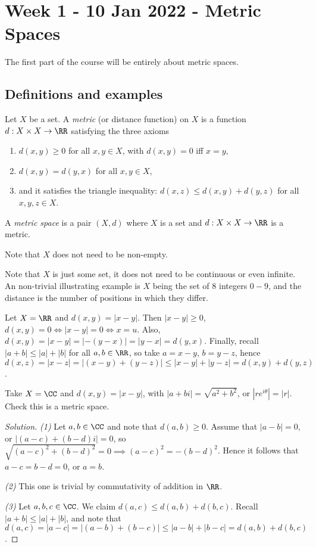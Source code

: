 \section{Week 1 - 10 Jan 2022 - Metric Spaces}
The first part of the course will be entirely about metric spaces.
\subsection{Definitions and examples}
\begin{definition}
  Let $X$ be a set. A \emph{metric} (or distance function) on $X$ is a function
  $d:X\times X \to \RR$ satisfying the three axioms
  \begin{enumerate}
    \item $d(x,y)\geq 0$ for all $x,y\in X$, with $d(x,y)=0$ iff $x=y$,
    \item $d(x,y)=d(y,x)$ for all $x,y\in X$,
    \item and it satisfies the triangle inequality: $d(x,z)\leq d(x,y)+d(y,z)$
      for all $x,y,z\in X$.
  \end{enumerate}
  \label{def:metric}
\end{definition}
\begin{definition}
  A \emph{metric space} is a pair $(X,d)$ where $X$ is a set and $d:X\times
  X\to\RR$ is a metric.
  \label{def:metricSpace}
\end{definition}
\begin{remark}
  Note that $X$ does not need to be non-empty.
\end{remark}
Note that $X$ is just some set, it does not need to be continuous or even
infinite. An non-trivial illustrating example is $X$ being the set of $8$
integers $0-9$, and the distance is the number of positions in which they
differ.
\begin{example}
  Let $X=\RR$ and $d(x,y)=|x-y|$. Then $|x-y|\geq 0$, $d(x,y)=0 \iff |x-y|=0
  \iff x=u$. Also, $d(x,y)=|x-y|=|-(y-x)|=|y-x|=d(y,x)$. Finally, recall
    $|a+b|\leq |a|+|b|$ for all $a,b\in\RR$, so take $a=x-y$, $b=y-z$, hence
    $d(x,z)=|x-z|=|(x-y)+(y-z)|\leq |x-y|+|y-z|=d(x,y)+d(y,z)$.
\end{example}
\begin{exercise}
  Take $X=\CC$ and $d(x,y)=|x-y|$, with $|a+bi|=\sqrt{a^2 + b^2}$, or
  $|re^{i\theta}|=|r|$. Check this is a metric space.
\end{exercise}
\begin{proof}[Solution]
  \emph{(1)} Let $a,b\in\CC$ and note that $d(a,b)\geq 0$. Assume that
  $|a-b|=0$, or $|(a-c)+(b-d)i|=0$, so $\sqrt{(a-c)^2+(b-d)^2}=0\implies
  (a-c)^2=-(b-d)^2$. Hence it follows that $a-c=b-d=0$, or $a=b$.

  \emph{(2)} This one is trivial by commutativity of addition in $\RR$.

  \emph{(3)} Let $a,b,c\in\CC$. We claim $d(a,c)\leq d(a,b)+d(b,c)$. Recall
  $|a+b|\leq |a|+|b|$, and note that $d(a,c)=|a-c|=|(a-b)+(b-c)| \leq
  |a-b|+|b-c|=d(a,b)+d(b,c)$.
\end{proof}
